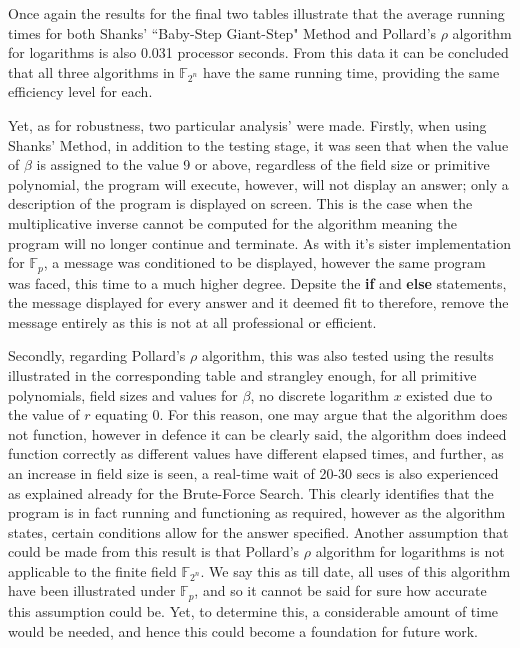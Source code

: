 \documentclass[iwp,first]{luthesis}
\begin{document}
Once again the results for the final two tables illustrate that the average running times for both Shanks' ``Baby-Step Giant-Step" Method and Pollard's $\rho$ algorithm for logarithms is also 0.031 processor seconds. From this data it can be concluded that all three algorithms in $\mathbb{F}_{2^n}$ have the same running time, providing the same efficiency level for each.

Yet, as for robustness, two particular analysis' were made. Firstly, when using Shanks' Method, in addition to the testing stage, it was seen that when the value of $\beta$ is assigned to the value 9 or above, regardless of the field size or primitive polynomial, the program will execute, however, will not display an answer; only a description of the program is displayed on screen. This is the case when the multiplicative inverse cannot be computed for the algorithm meaning the program will no longer continue and terminate. As with it's sister implementation for $\mathbb{F}_{p}$, a message was conditioned to be displayed, however the same program was faced, this time to a much higher degree. Depsite the \textbf{if} and \textbf{else} statements, the message displayed for every answer and it deemed fit to therefore, remove the message entirely as this is not at all professional or efficient.

Secondly, regarding Pollard's $\rho$ algorithm, this was also tested using the results illustrated in the corresponding table and strangley enough, for all primitive polynomials, field sizes and values for $\beta$, no discrete logarithm $x$ existed due to the value of $r$ equating 0. For this reason, one may argue that the algorithm does not function, however in defence it can be clearly said, the algorithm does indeed function correctly as different values have different elapsed times, and further, as an increase in field size is seen, a real-time wait of 20-30 secs is also experienced as explained already for the Brute-Force Search. This clearly identifies that the program is in fact running and functioning as required, however as the algorithm states, certain conditions allow for the answer specified. Another assumption that could be made from this result is that Pollard's $\rho$ algorithm for logarithms is not applicable to the finite field $\mathbb{F}_{2^n}$. We say this as till date, all uses of this algorithm have been illustrated under $\mathbb{F}_p$, and so it cannot be said for sure how accurate this assumption could be. Yet, to determine this, a considerable amount of time would be needed, and hence this could become a foundation for future work. 
\end{document}

